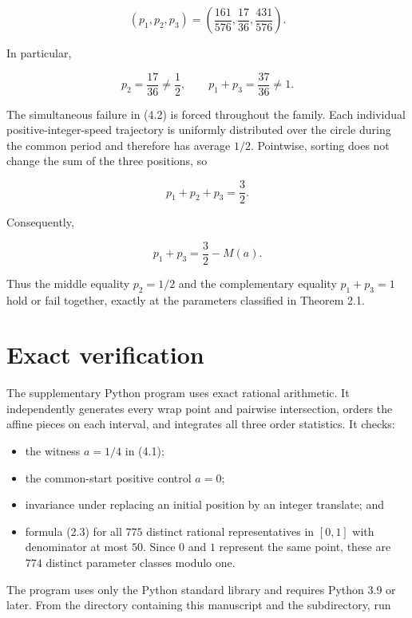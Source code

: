 \documentclass[11pt]{article}
\numberwithin{equation}{section}
\begin{document}
\nopagebreak[4]
\[
(p_1,p_2,p_3)=
\left(\frac{161}{576},\frac{17}{36},\frac{431}{576}\right).
\tag{4.1}
\]

In particular,

\nopagebreak[4]
\[
p_2=\frac{17}{36}\neq\frac12,
\qquad
p_1+p_3=\frac{37}{36}\neq1.
\tag{4.2}
\]

The simultaneous failure in (4.2) is forced throughout the family. Each
individual positive-integer-speed trajectory is uniformly distributed over
the circle during the common period and therefore has average $1/2$.
Pointwise, sorting does not change the sum of the three positions, so

\nopagebreak[4]
\[
p_1+p_2+p_3=\frac32.
\tag{4.3}
\]

Consequently,

\nopagebreak[4]
\[
p_1+p_3=\frac32-M(a).
\tag{4.4}
\]

Thus the middle equality $p_2=1/2$ and the complementary equality
$p_1+p_3=1$ hold or fail together, exactly at the parameters classified in
Theorem 2.1.

\section{Exact verification}


The supplementary Python program
{\small{}\allowbreak{}} uses exact rational
arithmetic. It independently generates every wrap point and pairwise
intersection, orders the affine pieces on each interval, and integrates all
three order statistics. It checks:

\begin{itemize}
\item the witness $a=1/4$ in (4.1);
\item the common-start positive control $a=0$;
\item invariance under replacing an initial position by an integer translate; and
\item formula (2.3) for all $775$ distinct rational representatives in $[0,1]$
with denominator at most $50$. Since $0$ and $1$ represent the same point,
these are $774$ distinct parameter classes modulo one.

\end{itemize}

The program uses only the Python standard library and requires Python 3.9 or
later. From the directory containing this manuscript and the {\small{}}
subdirectory, run
\end{document}
